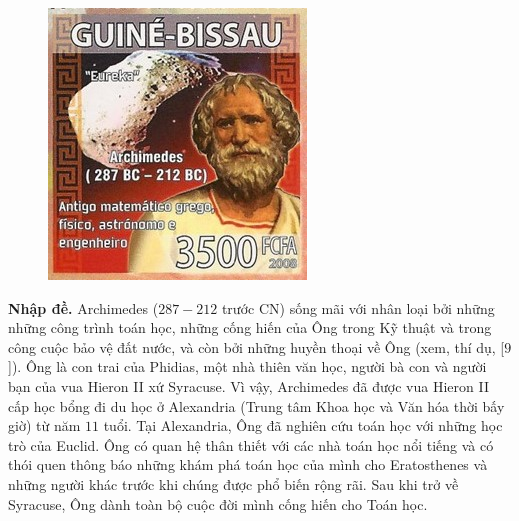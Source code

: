 \begin{multicols}{2}
	\begin{figure}[H]
		\vspace*{5pt}
		\centering
		\captionsetup{labelformat= empty, justification=centering}
		\includegraphics[width= 1\linewidth]{1}
		\vspace*{-20pt}
	\end{figure}
	\textbf{\color{lichsutoanhoc}Nhập đề.} Archimedes ($287-212$ trước CN) sống mãi với nhân loại bởi những những công trình toán học, những cống hiến của Ông trong Kỹ thuật và trong công cuộc bảo vệ đất nước, và còn bởi những huyền thoại về Ông (xem, thí dụ, [$9$]).
	\vskip 0.1cm
	Ông là con trai của Phidias, một nhà thiên văn học, người bà con và người bạn của vua Hieron II xứ Syracuse. Vì vậy, Archimedes đã được vua Hieron II cấp học bổng đi du học ở Alexandria (Trung tâm Khoa học và Văn hóa thời bấy giờ) từ năm $11$ tuổi. Tại Alexandria, Ông đã nghiên cứu toán học với những học trò của Euclid. Ông có quan hệ thân thiết với các nhà toán học nổi tiếng và có thói quen thông báo những khám phá toán học của mình cho Eratosthenes và những người khác trước khi chúng được phổ biến rộng rãi.  
	\vskip 0.1cm
	Sau khi trở về Syracuse, Ông dành toàn bộ cuộc đời mình cống hiến cho Toán học. 

\end{multicols}
